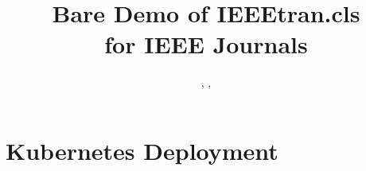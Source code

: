 \documentclass[journal]{IEEEtran}
\begin{document}


\title{Bare Demo of IEEEtran.cls\\ for IEEE Journals}

\author{
  \authorOne,
  \authorTwo,
  \authorThree
}



\maketitle











\newpage
\appendices
\section{Kubernetes Deployment}

\end{document}
